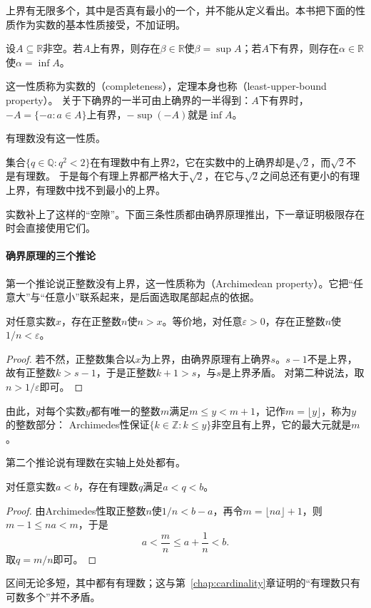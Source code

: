 上界有无限多个，其中是否真有最小的一个，并不能从定义看出。本书把下面的性质作为实数的基本性质接受，不加证明。
\begin{theorem}[确界原理]
\label{thm:ru-least-upper-bound}
设$A\subseteq\mathbb R$非空。若$A$上有界，则存在$\beta\in\mathbb R$使$\beta=\sup A$；若$A$下有界，则存在$\alpha\in\mathbb R$使$\alpha=\inf A$。
\end{theorem}
这一性质称为实数的（completeness），定理本身也称（least-upper-bound property）。
关于下确界的一半可由上确界的一半得到：$A$下有界时，$-A=\{-a:a\in A\}$上有界，$-\sup(-A)$就是$\inf A$。

有理数没有这一性质。
\begin{example}[有理数中没有最小上界]
\label{ex:ru-rational-no-least-upper-bound}
集合$\{q\in\mathbb Q:q^2<2\}$在有理数中有上界$2$，它在实数中的上确界却是$\sqrt2$，而$\sqrt2$不是有理数。
于是每个有理上界都严格大于$\sqrt2$，在它与$\sqrt2$之间总还有更小的有理上界，有理数中找不到最小的上界。
\end{example}
实数补上了这样的“空隙”。下面三条性质都由确界原理推出，下一章证明极限存在时会直接使用它们。

\paragraph{确界原理的三个推论}
第一个推论说正整数没有上界，这一性质称为（Archimedean property）。它把“任意大”与“任意小”联系起来，是后面选取尾部起点的依据。
\begin{theorem}[Archimedes性]
\label{thm:ru-archimedean}
对任意实数$x$，存在正整数$n$使$n>x$。等价地，对任意$\varepsilon>0$，存在正整数$n$使$1/n<\varepsilon$。
\end{theorem}
\begin{proof}
若不然，正整数集合以$x$为上界，由确界原理有上确界$s$。$s-1$不是上界，故有正整数$k>s-1$，于是正整数$k+1>s$，与$s$是上界矛盾。
对第二种说法，取$n>1/\varepsilon$即可。
\end{proof}
由此，对每个实数$y$都有唯一的整数$m$满足$m\leq y<m+1$，记作$m=\lfloor y\rfloor$，称为$y$的整数部分：
Archimedes性保证$\{k\in\mathbb Z:k\leq y\}$非空且有上界，它的最大元就是$m$。

第二个推论说有理数在实轴上处处都有。
\begin{theorem}[有理数的稠密性]
\label{thm:ru-rational-density}
对任意实数$a<b$，存在有理数$q$满足$a<q<b$。
\end{theorem}
\begin{proof}
由Archimedes性取正整数$n$使$1/n<b-a$，再令$m=\lfloor na\rfloor+1$，则$m-1\leq na<m$，于是
\[
 a<\frac mn\leq a+\frac1n<b.
\]
取$q=m/n$即可。
\end{proof}
区间无论多短，其中都有有理数；这与第~\ref{chap:cardinality}章证明的“有理数只有可数多个”并不矛盾。

